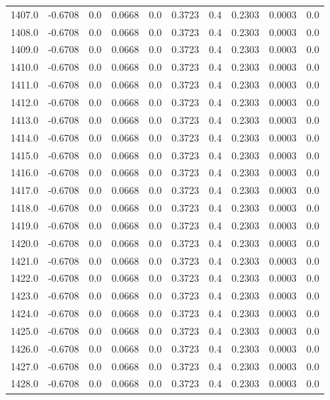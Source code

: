 \begin{longtable}{lrrrrrrrrr}
1407.0 & -0.6708 & 0.0 & 0.0668 & 0.0 & 0.3723 & 0.4 & 0.2303 & 0.0003 & 0.0 \\
1408.0 & -0.6708 & 0.0 & 0.0668 & 0.0 & 0.3723 & 0.4 & 0.2303 & 0.0003 & 0.0 \\
1409.0 & -0.6708 & 0.0 & 0.0668 & 0.0 & 0.3723 & 0.4 & 0.2303 & 0.0003 & 0.0 \\
1410.0 & -0.6708 & 0.0 & 0.0668 & 0.0 & 0.3723 & 0.4 & 0.2303 & 0.0003 & 0.0 \\
1411.0 & -0.6708 & 0.0 & 0.0668 & 0.0 & 0.3723 & 0.4 & 0.2303 & 0.0003 & 0.0 \\
1412.0 & -0.6708 & 0.0 & 0.0668 & 0.0 & 0.3723 & 0.4 & 0.2303 & 0.0003 & 0.0 \\
1413.0 & -0.6708 & 0.0 & 0.0668 & 0.0 & 0.3723 & 0.4 & 0.2303 & 0.0003 & 0.0 \\
1414.0 & -0.6708 & 0.0 & 0.0668 & 0.0 & 0.3723 & 0.4 & 0.2303 & 0.0003 & 0.0 \\
1415.0 & -0.6708 & 0.0 & 0.0668 & 0.0 & 0.3723 & 0.4 & 0.2303 & 0.0003 & 0.0 \\
1416.0 & -0.6708 & 0.0 & 0.0668 & 0.0 & 0.3723 & 0.4 & 0.2303 & 0.0003 & 0.0 \\
1417.0 & -0.6708 & 0.0 & 0.0668 & 0.0 & 0.3723 & 0.4 & 0.2303 & 0.0003 & 0.0 \\
1418.0 & -0.6708 & 0.0 & 0.0668 & 0.0 & 0.3723 & 0.4 & 0.2303 & 0.0003 & 0.0 \\
1419.0 & -0.6708 & 0.0 & 0.0668 & 0.0 & 0.3723 & 0.4 & 0.2303 & 0.0003 & 0.0 \\
1420.0 & -0.6708 & 0.0 & 0.0668 & 0.0 & 0.3723 & 0.4 & 0.2303 & 0.0003 & 0.0 \\
1421.0 & -0.6708 & 0.0 & 0.0668 & 0.0 & 0.3723 & 0.4 & 0.2303 & 0.0003 & 0.0 \\
1422.0 & -0.6708 & 0.0 & 0.0668 & 0.0 & 0.3723 & 0.4 & 0.2303 & 0.0003 & 0.0 \\
1423.0 & -0.6708 & 0.0 & 0.0668 & 0.0 & 0.3723 & 0.4 & 0.2303 & 0.0003 & 0.0 \\
1424.0 & -0.6708 & 0.0 & 0.0668 & 0.0 & 0.3723 & 0.4 & 0.2303 & 0.0003 & 0.0 \\
1425.0 & -0.6708 & 0.0 & 0.0668 & 0.0 & 0.3723 & 0.4 & 0.2303 & 0.0003 & 0.0 \\
1426.0 & -0.6708 & 0.0 & 0.0668 & 0.0 & 0.3723 & 0.4 & 0.2303 & 0.0003 & 0.0 \\
1427.0 & -0.6708 & 0.0 & 0.0668 & 0.0 & 0.3723 & 0.4 & 0.2303 & 0.0003 & 0.0 \\
1428.0 & -0.6708 & 0.0 & 0.0668 & 0.0 & 0.3723 & 0.4 & 0.2303 & 0.0003 & 0.0 \\

\end{longtable}
